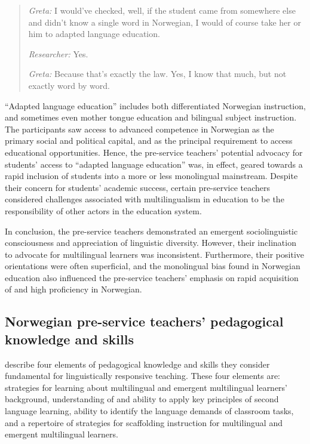 \documentclass[output=paper]{langscibook}
\begin{document}
\begin{quote}
\emph{Greta:} I would’ve checked, well, if the student came from somewhere else and didn’t know a single word in Norwegian, I would of course take her or him to adapted language education.

\emph{Researcher:} Yes. 

\emph{Greta:} Because that’s exactly the law. Yes, I know that much, but not exactly word by word.  
\end{quote}

“Adapted language education” includes both differentiated Norwegian instruction, and sometimes even mother tongue education and bilingual subject instruction. The participants saw access to advanced competence in Norwegian as the primary social and political capital, and as the principal requirement to access educational opportunities. Hence, the pre-service teachers’ potential advocacy for students’ access to “adapted language education” was, in effect, geared towards a rapid inclusion of students into a more or less monolingual mainstream. Despite their concern for students’ academic success, certain pre-service teachers considered challenges associated with multilingualism in education to be the responsibility of other actors in the education system. 

In conclusion, the pre-service teachers demonstrated an emergent sociolinguistic consciousness and appreciation of linguistic diversity. However, their inclination to advocate for multilingual learners was inconsistent. Furthermore, their positive orientations were often superficial, and the monolingual bias found in Norwegian education also influenced the pre-service teachers’ emphasis on rapid acquisition of and high proficiency in Norwegian.  

\subsection{Norwegian pre-service teachers’ pedagogical knowledge and skills}

\citet{LucasVillegas2013} describe four elements of pedagogical knowledge and skills they consider fundamental for linguistically responsive teaching. These four elements are: strategies for learning about multilingual and emergent multilingual learners’ background, understanding of and ability to apply key principles of second language learning, ability to identify the language demands of classroom tasks, and a repertoire of strategies for scaffolding instruction for multilingual and emergent multilingual learners.
\end{document}
